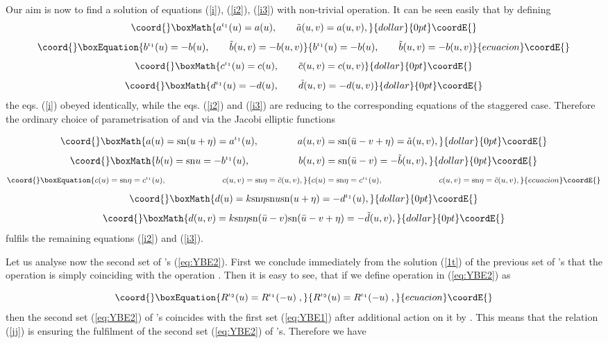 \documentclass[a4paper,11pt]{article}
\def\sn{{\rm{sn}}}
\begin{document}
Our aim is now to find a solution of equations (\ref{i}), (\ref{i2}), 
(\ref{i3}) with non-trivial \coordHE{} operation. 
It can be seen easily that by defining
$$\coord{}\boxMath{
a^{\iota_1}(u)=a(u),\qquad \tilde a(u,v)=a(u,v),
}{dollar}{0pt}\coordE{}$$
\begin{equation}\coord{}\boxEquation{
\label{1t}
b^{\iota_1}(u)=-b(u),\qquad \tilde b(u,v)=-b(u,v)
}{
b^{\iota_1}(u)=-b(u),\qquad \tilde b(u,v)=-b(u,v)
}{ecuacion}\coordE{}\end{equation}
$$\coord{}\boxMath{
c^{\iota_1}(u)=c(u),\qquad \tilde c(u,v)=c(u,v)
}{dollar}{0pt}\coordE{}$$  $$\coord{}\boxMath{
d^{\iota_1}(u)=-d(u),\qquad \tilde d(u,v)=-d(u,v)
}{dollar}{0pt}\coordE{}$$
the eqs. (\ref{i}) obeyed identically, while the eqs. 
(\ref{i2}) and (\ref{i3}) are reducing to the corresponding equations of 
the staggered case. Therefore the ordinary choice of parametrisation
of \coordHE{} and \coordHE{} via the Jacobi elliptic
functions 

$$\coord{}\boxMath{
a(u)=\sn(u+\eta)=a^{\iota_1}(u),\qquad\qquad a(u,v)=
\sn(\bar u-v+\eta)=\tilde a(u,v),
}{dollar}{0pt}\coordE{}$$  $$\coord{}\boxMath{
b(u)=\sn u=-b^{\iota_1}(u),\qquad\qquad\quad b(u,v)=
\sn(\bar u-v)=-\tilde b(u,v),
}{dollar}{0pt}\coordE{}$$
\begin{equation}\coord{}\boxEquation{
\label{t1}
c(u)=\sn\eta=c^{\iota_1}(u),\qquad\quad\qquad\qquad c(u,v)=
\sn\eta=\tilde c(u,v),
}{
c(u)=\sn\eta=c^{\iota_1}(u),\qquad\quad\qquad\qquad c(u,v)=
\sn\eta=\tilde c(u,v),
}{ecuacion}\coordE{}\end{equation}
$$\coord{}\boxMath{
d(u)=k\sn\eta\sn u\sn(u+\eta)=-d^{\iota_1}(u),
}{dollar}{0pt}\coordE{}$$  $$\coord{}\boxMath{
d(u,v)=k\sn\eta \sn(\bar u-v)\sn(\bar u-v+\eta)=-\tilde d(u,v),
}{dollar}{0pt}\coordE{}$$
fulfils the remaining equations (\ref{i2}) and (\ref{i3}).

Let us analyse now the second set of \coordHE{}'s (\ref{eq:YBE2}). 
First we conclude immediately from the solution (\ref{1t})
of the previous set of \coordHE{}'s that the operation  \myHighlight{$\tilde{}~$}\coordHE{}  
is simply coinciding with the operation \coordHE{}.
Then it is easy to see, that if we define \coordHE{}
operation in (\ref{eq:YBE2}) as

\begin{equation}\coord{}\boxEquation{
\label{jj}
R^{\iota_2}(u)=R^{\iota_1}(-u) \;,
}{
R^{\iota_2}(u)=R^{\iota_1}(-u) \;,
}{ecuacion}\coordE{}\end{equation}
then the second set (\ref{eq:YBE2}) of \coordHE{}'s 
coincides with the first set (\ref{eq:YBE1}) after additional
action on it by \coordHE{}. This means that the relation (\ref{jj})
is ensuring the fulfilment of the second set (\ref{eq:YBE2})
of \coordHE{}'s. Therefore we have
\end{document}
